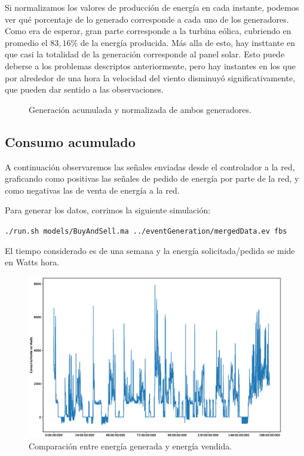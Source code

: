 Si normalizamos los valores de producción de energía en cada instante,
podemos ver qué porcentaje de lo generado corresponde a cada uno de los
generadores. Como era de esperar, gran parte corresponde a la turbina
eólica, cubriendo en promedio el \(83,16\%\) de la energía producida.
Más alla de esto, hay insttante en que casi la totalidad de la
generación corresponde al panel solar. Esto puede deberse a los
problemas descriptos anteriormente, pero hay instantes en los que por
alrededor de una hora la velocidad del viento disminuyó
significativamente, que pueden dar sentido a las observaciones.

\begin{figure}[H]
    \begin{center}
    \end{center}
    \caption{Generación acumulada y normalizada de ambos generadores.}
\end{figure}

\subsection{Consumo acumulado}
A continuación observaremos las señales enviadas desde el controlador a la red, graficando
como positivas las señales de pedido de energía por parte de la red, y como negativas las
de venta de energía a la red.

Para generar los datos, corrimos la siguiente simulación:

{\tt ./run.sh models/BuyAndSell.ma ../eventGeneration/mergedData.ev fbs}

El tiempo considerado es de una semana y la energía solicitada/pedida se mide en Watts hora.
 
\begin{figure}[H]
    \centering
    \includegraphics[scale=0.3]{images/cons.eps}
    \caption{Comparación entre energía generada y energía vendida.}
\end{figure}


